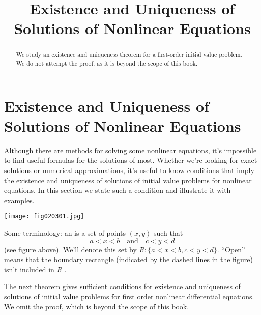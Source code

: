 \documentclass{ximera}
\title{Existence and Uniqueness of Solutions of Nonlinear Equations}%
\begin{document}
\begin{abstract}
We study  an existence and uniqueness theorem for a first-order initial value problem.  We do not attempt the proof, as it is beyond the scope of this book.
\end{abstract}

\maketitle

\section*{Existence and Uniqueness of Solutions of Nonlinear Equations}

Although  there are  methods for
 solving some nonlinear equations, it's
impossible to find  useful formulas for the solutions of most.
Whether we're looking for  exact solutions or numerical
approximations, it's useful to know  conditions that imply the
existence and uniqueness of solutions of initial value problems for
nonlinear equations. In this section we state  such a condition and
illustrate it with examples.

\begin{image}
 \texttt{[image: fig020301.jpg]}
\end{image}




Some terminology:
 an 
 is a set of points $(x,y)$ such that
$$
a<x<b\quad\mbox{and}\quad c<y<d
$$
 (see figure above).  We'll denote this set by
$R:  \{ a < x < b, c < y < d \}$.
 ``Open'' means that the
boundary rectangle (indicated by the dashed lines in
the figure) isn't  included in  $R$ .

The next theorem gives sufficient conditions for existence and
uniqueness of solutions of initial value problems for first order
nonlinear differential equations. We omit the proof, which is beyond
the scope of this book.
\end{document}
